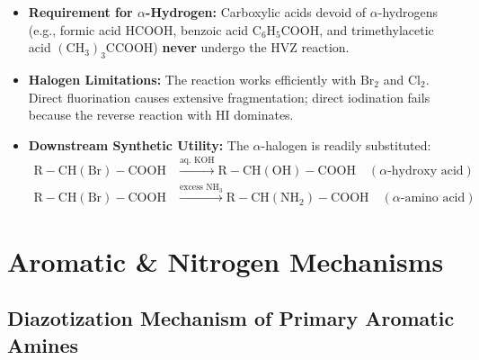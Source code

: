 \documentclass[10pt,twoside,openright]{book}
\begin{document}
\begin{trapbox}
\begin{itemize}
  \item \textbf{Requirement for $\alpha$-Hydrogen:} Carboxylic acids devoid of $\alpha$-hydrogens (e.g., formic acid $\mathrm{HCOOH}$, benzoic acid $\mathrm{C_6H_5COOH}$, and trimethylacetic acid $\mathrm{(CH_3)_3CCOOH}$) \textbf{never} undergo the HVZ reaction.
  \item \textbf{Halogen Limitations:} The reaction works efficiently with $\mathrm{Br_2}$ and $\mathrm{Cl_2}$. Direct fluorination causes extensive fragmentation; direct iodination fails because the reverse reaction with $\mathrm{HI}$ dominates.
  \item \textbf{Downstream Synthetic Utility:} The $\alpha$-halogen is readily substituted:
  \begin{align*}
    \mathrm{R-CH(Br)-COOH} &\xrightarrow{\text{aq. } \mathrm{KOH}} \mathrm{R-CH(OH)-COOH} \quad (\alpha\text{-hydroxy acid})\\
    \mathrm{R-CH(Br)-COOH} &\xrightarrow{\text{excess } \mathrm{NH_3}} \mathrm{R-CH(NH_2)-COOH} \quad (\alpha\text{-amino acid})
  \end{align*}
\end{itemize}
\end{trapbox}

\newpage
\section{Aromatic \& Nitrogen Mechanisms}

\subsection{Diazotization Mechanism of Primary Aromatic Amines}
\end{document}
